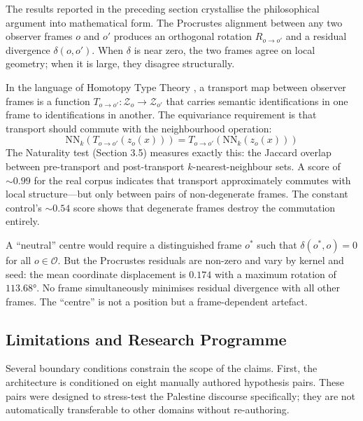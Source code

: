 The results reported in the preceding section crystallise the philosophical argument into mathematical form. The Procrustes alignment between any two observer frames $o$ and $o'$ produces an orthogonal rotation $R_{o \to o'}$ and a residual divergence $\delta(o, o')$. When $\delta$ is near zero, the two frames agree on local geometry; when it is large, they disagree structurally.

In the language of Homotopy Type Theory \citep{hottbook2013}, a transport map between observer frames is a function $T_{o \to o'}\colon \mathcal{Z}_o \to \mathcal{Z}_{o'}$ that carries semantic identifications in one frame to identifications in another. The equivariance requirement is that transport should commute with the neighbourhood operation:
\begin{equation}
    \mathrm{NN}_k(T_{o \to o'}(z_o(x))) = T_{o \to o'}(\mathrm{NN}_k(z_o(x)))
\end{equation}
The Naturality test (Section 3.5) measures exactly this: the Jaccard overlap between pre-transport and post-transport $k$-nearest-neighbour sets. A score of $\sim 0.99$ for the real corpus indicates that transport approximately commutes with local structure---but only between pairs of non-degenerate frames. The constant control's $\sim 0.54$ score shows that degenerate frames destroy the commutation entirely.

A ``neutral'' centre would require a distinguished frame $o^*$ such that $\delta(o^*, o) = 0$ for all $o \in \mathcal{O}$. But the Procrustes residuals are non-zero and vary by kernel and seed: the mean coordinate displacement is $0.174$ with a maximum rotation of $113.68°$. No frame simultaneously minimises residual divergence with all other frames. The ``centre'' is not a position but a frame-dependent artefact.

\subsection{Limitations and Research Programme}

Several boundary conditions constrain the scope of the claims. First, the architecture is conditioned on eight manually authored hypothesis pairs. These pairs were designed to stress-test the Palestine discourse specifically; they are not automatically transferable to other domains without re-authoring.


